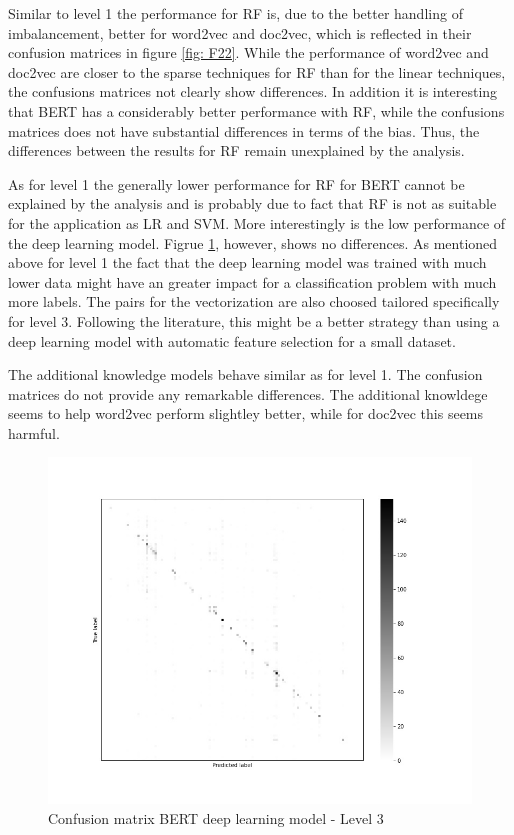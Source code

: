 \documentclass[12pt, a4paper, titlepage]{article}
\begin{document}
Similar to level 1 the performance for \ac{RF} is, due to the better handling of imbalancement, better for word2vec and doc2vec, which is reflected in their confusion matrices in figure \ref{fig: F22}. While the performance of word2vec and doc2vec are closer to the sparse techniques for \ac{RF} than for the linear techniques, the confusions matrices not clearly show differences. In addition it is interesting that \ac{BERT} has a considerably better performance with \ac{RF}, while the confusions matrices does not have substantial differences in terms of the bias. Thus, the differences between the results for \ac{RF} remain unexplained by the analysis.

As for level 1 the generally lower performance for \ac{RF} for \ac{BERT} cannot be explained by the analysis and is probably due to fact that \ac{RF} is not as suitable for the application as \ac{LR} and \ac{SVM}. More interestingly is the low performance of the deep learning model. Figrue \ref{fig: F26}, however, shows no differences. As mentioned above for level 1 the fact that the deep learning model was trained with much lower data might have an greater impact for a classification problem with much more labels. The pairs for the vectorization are also choosed tailored specifically for level 3. Following the literature, this might be a  better strategy than using a deep learning model with automatic feature selection for a small dataset. 

The additional knowledge models behave similar as for level 1. The confusion matrices do not provide any remarkable differences. The additional knowldege seems to help word2vec perform slightley better, while for doc2vec this seems harmful. 

\begin{figure}[hb!]
  \center
  \includegraphics[scale=0.5]{cm_bert_clf_3.jpg}
  \caption{\label{fig: F26} Confusion matrix \ac{BERT} deep learning model - Level 3}
\end{figure}
\end{document}
